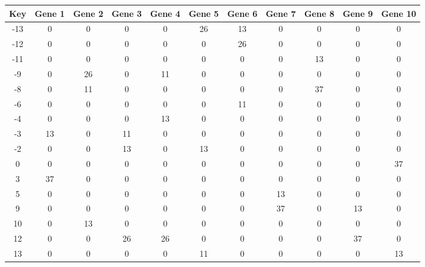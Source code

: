 \begin{tabular}{|c|c|c|c|c|c|c|c|c|c|c|}
\hline
Key & Gene 1 & Gene 2 & Gene 3 & Gene 4 & Gene 5 & Gene 6 & Gene 7 & Gene 8 & Gene 9 & Gene 10 \\
\hline
-13 & 0 & 0 & 0 & 0 & 26 & 13 & 0 & 0 & 0 & 0 \\
-12 & 0 & 0 & 0 & 0 & 0 & 26 & 0 & 0 & 0 & 0 \\
-11 & 0 & 0 & 0 & 0 & 0 & 0 & 0 & 13 & 0 & 0 \\
-9 & 0 & 26 & 0 & 11 & 0 & 0 & 0 & 0 & 0 & 0 \\
-8 & 0 & 11 & 0 & 0 & 0 & 0 & 0 & 37 & 0 & 0 \\
-6 & 0 & 0 & 0 & 0 & 0 & 11 & 0 & 0 & 0 & 0 \\
-4 & 0 & 0 & 0 & 13 & 0 & 0 & 0 & 0 & 0 & 0 \\
-3 & 13 & 0 & 11 & 0 & 0 & 0 & 0 & 0 & 0 & 0 \\
-2 & 0 & 0 & 13 & 0 & 13 & 0 & 0 & 0 & 0 & 0 \\
0 & 0 & 0 & 0 & 0 & 0 & 0 & 0 & 0 & 0 & 37 \\
3 & 37 & 0 & 0 & 0 & 0 & 0 & 0 & 0 & 0 & 0 \\
5 & 0 & 0 & 0 & 0 & 0 & 0 & 13 & 0 & 0 & 0 \\
9 & 0 & 0 & 0 & 0 & 0 & 0 & 37 & 0 & 13 & 0 \\
10 & 0 & 13 & 0 & 0 & 0 & 0 & 0 & 0 & 0 & 0 \\
12 & 0 & 0 & 26 & 26 & 0 & 0 & 0 & 0 & 37 & 0 \\
13 & 0 & 0 & 0 & 0 & 11 & 0 & 0 & 0 & 0 & 13 \\
\hline
\end{tabular}